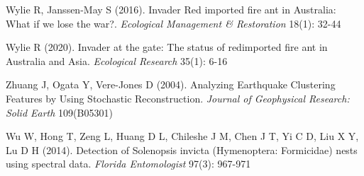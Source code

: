 \documentclass[11pt,a4paper]{article}
\begin{document}
\begin{thebibliography}{99}

 Wylie R, Janssen-May S (2016). Invader  Red imported fire ant in Australia:  What if we lose the war?. \textit{Ecological Management & Restoration} 18(1): 32-44

 Wylie R (2020). Invader at the gate: The status of redimported fire ant in Australia and Asia. \textit{Ecological Research} 35(1): 6-16

 Zhuang J, Ogata Y, Vere-Jones D (2004). Analyzing Earthquake Clustering Features by Using Stochastic Reconstruction. \textit{Journal of Geophysical Research: Solid Earth} 109(B05301)

 Wu W, Hong T, Zeng L, Huang D L, Chileshe J M, Chen J T, Yi C D, Liu X Y, Lu D H (2014). Detection of Solenopsis invicta (Hymenoptera: Formicidae) nests using spectral data. \textit{Florida Entomologist} 97(3): 967-971

\end{thebibliography}
\end{document}
